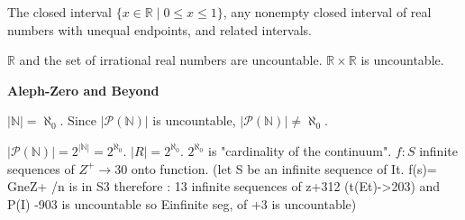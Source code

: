 \documentclass{article}
\begin{document}
\begin{multicols}{3}
\noindent
The closed interval $\{x \in \mathbb{R} \mid 0 \le x \le 1\}$, any nonempty closed interval of real numbers with unequal endpoints, and related intervals.

\noindent
$\mathbb{R}$ and the set of irrational real numbers are uncountable.  $\mathbb{R} \times \mathbb{R}$ is uncountable.

\noindent
\textbf{Aleph-Zero and Beyond}

\noindent
$|\mathbb{N}| = \aleph_0$. Since $|\mathcal{P}(\mathbb{N})|$ is uncountable, $|\mathcal{P}(\mathbb{N})| \neq \aleph_0$.

\noindent
$|\mathcal{P}(\mathbb{N})| = 2^{|\mathbb{N}|} = 2^{\aleph_0}$. $|R| = 2^{\aleph_0}$.  $2^{\aleph_0}$ is "cardinality of the continuum".
\noindent
$f: S$ infinite sequences of $Z^+ \to 30$ onto function. (let S be an infinite sequence of It. f(s)= GneZ+ /n is in S3 therefore : 13 infinite sequences of z+312 (t(Et)->203) and P(I) -903 is uncountable so Einfinite seg, of +3 is uncountable)

\end{multicols}
\end{document}
